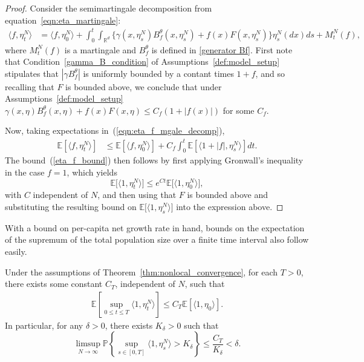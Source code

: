 \documentclass[EJP]{ejpecp} %
\newcommand{\IP}{\mathbb P}
\newcommand{\IE}{\mathbb E}
\newcommand{\IR}{\mathbb R}
\begin{document}
\begin{proof}
Consider the semimartingale decomposition from equation~\eqref{eqn:eta_martingale}:
\begin{align} \label{eqn:eta_f_mgale_decomp}
    \langle f, \eta^N_t \rangle
    &=
    \langle f, \eta^N_0 \rangle
    + \int_0^t \int_{\IR^d} \big\{
        \gamma(x, \eta^N_s) B^\theta_f(x, \eta^N_s)
        + f(x) F(x, \eta^N_s)
        \big\} \eta^N_s(dx) ds
    + M^N_t(f) ,
\end{align}
where $M^N_t(f)$ is a martingale and $B^\theta_f$ is defined in \eqref{generator Bf}.
First note that Condition~\ref{gamma_B_condition} of Assumptions~\ref{def:model_setup}
stipulates that $|\gamma B^\theta_f|$ is uniformly bounded by a contant times $1 + f$,
and so recalling that $F$ is bounded above, we conclude that
under Assumptions~\ref{def:model_setup}
$\gamma(x, \eta) B^\theta_f(x, \eta) + f(x) F(x, \eta) \le C_f (1 + |f(x)|)$ for some $C_f$.

Now, taking expectations in~(\ref{eqn:eta_f_mgale_decomp}),
    \begin{align}
\label{bound on intfdeta}
        \IE\left[ \langle f, \eta^N_t \rangle \right]
        &\le
        \IE\left[ \langle f, \eta^N_0 \rangle \right]
        + C_f \int_0^t \IE\left[ \langle 1 + |f|, \eta^N_s \rangle \right] dt .
    \end{align}
The bound~(\ref{eta_f_bound}) then follows by first applying Gronwall's
inequality in the case $f=1$, which yields
\[
	\IE\big[\langle 1,\eta_t^N\rangle\big]\leq e^{Ct}\IE\big[\langle 1,\eta_0^N\rangle\big],
\]
with $C$ independent of $N$, and then using that $F$ is bounded above and substituting 
the resulting bound on $\IE\big[\langle 1,\eta_s^N\rangle\big]$ into the
expression above.
\end{proof}

With a bound on per-capita net growth rate in hand,
bounds on the expectation of the supremum of 
the total population size over a finite time interval also follow easily.

\begin{lemma}
    \label{lem:eta_compact_containment}
    Under the assumptions of Theorem~\ref{thm:nonlocal_convergence},
    for each $T>0$, there exists some constant $C_T$,
independent of $N$,
    such that
    \begin{align}
        \label{eqn:eta_mass_bound}
        \IE\left[
            \sup_{0 \le t \le T}
            \langle 1, \eta^{N}_t \rangle
        \right]
        \le C_T \IE[\langle 1,\eta_0\rangle].
    \end{align}
    In particular, for any $\delta > 0$, there exists $K_{\delta}>0$ such that
    \begin{equation}
    \limsup_{N \to \infty}
        \IP \left\{ \sup_{s \in [0,T]}
            \langle 1 ,\eta^{N}_{s}\rangle
            > K_\delta \right\}
        \leq \frac{C_T}{K_{\delta}}
        < \delta.
    \end{equation}
\end{lemma}
\end{document}
